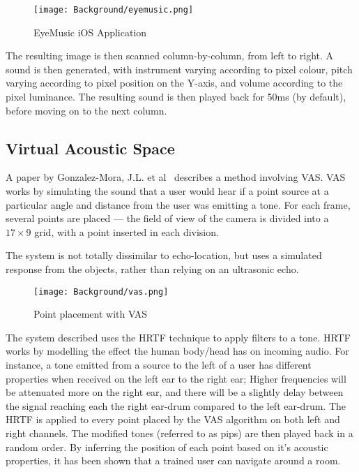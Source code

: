 \begin{figure}[H]
    \centering
    \texttt{[image: Background/eyemusic.png]}
    \caption{EyeMusic iOS Application}
\end{figure}

The resulting image is then scanned column-by-column, from left to right. A sound is then generated, with instrument varying according to pixel colour, pitch varying according to pixel position on the Y-axis, and volume according to the pixel luminance. The resulting sound is then played back for 50ms (by default), before moving on to the next column. 



\subsection{Virtual Acoustic Space}
\label{sec:vas}
A paper by Gonzalez-Mora, J.L. et al~\cite{vas} describes a method involving \ac{VAS}. \ac{VAS} works by simulating the sound that a user would hear if a point source at a particular angle and distance from the user was emitting a tone. For each frame, several points are placed --- the field of view of the camera is divided into a $17\times9$ grid, with a point inserted in each division. 

The system is not totally dissimilar to echo-location, but uses a simulated response from the objects, rather than relying on an ultrasonic echo.

\begin{figure}[H]
    \centering
    \texttt{[image: Background/vas.png]}
    \caption{Point placement with \ac{VAS}}
\end{figure}

The system described uses the \ac{HRTF} technique to apply filters to a tone. \ac{HRTF} works by modelling the effect the human body/head has on incoming audio. For instance, a tone emitted from a source to the left of a user has different properties when received on the left ear to the right ear; Higher frequencies will be attenuated more on the right ear, and there will be a slightly delay between the signal reaching each the right ear-drum compared to the left ear-drum. The \ac{HRTF} is applied to every point placed by the \ac{VAS} algorithm on both left and right channels. The modified tones (referred to as pips) are then played back in a random order. By inferring the position of each point based on it's acoustic properties, it has been shown that a trained user can navigate around a room.

